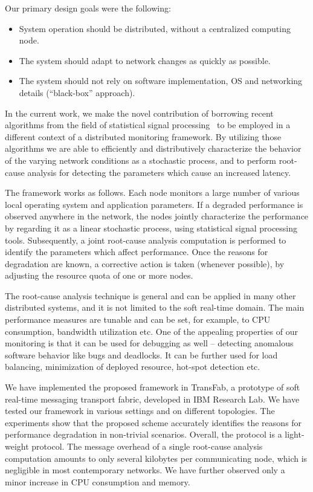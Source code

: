 \documentclass[times, 10pt,twocolumn]{article}
\begin{document}
Our primary design goals were the following:
\begin{itemize}
\item System operation should be distributed, without a centralized computing node.
\item The system should adapt to network changes as quickly as possible.
\item The system should not rely on software implementation, OS and networking details (``black-box'' approach).
\end{itemize}

In the current work, we make the novel contribution of borrowing recent algorithms from the field of statistical signal processing~\cite{Allerton08-2,ISIT1} to be employed in a different context of a distributed monitoring framework. By utilizing those algorithms we are able to efficiently and distributively characterize the behavior of the varying network conditions as a stochastic process, and to perform root-cause analysis for detecting the parameters which cause an increased latency.


The framework works as follows. Each node monitors a large number of various local operating system and application  parameters. If a degraded performance is observed anywhere in the network, the nodes jointly characterize the performance by regarding it as a linear stochastic process, using statistical signal processing tools. Subsequently,
a joint root-cause analysis computation is performed to identify the parameters which affect performance.
Once the reasons for degradation are known, a corrective action is taken (whenever possible), by adjusting the resource quota of one or more nodes.

The root-cause analysis technique is general and can be applied in many other distributed systems,
and it is not limited to the soft real-time domain. The main performance measures are tunable and can be
set, for example, to CPU consumption, bandwidth utilization etc. One of the appealing properties of our monitoring is that it can be used for debugging as well -- detecting anomalous software behavior
like bugs and deadlocks. It can be further used for load balancing, minimization
of deployed resource, hot-spot detection etc.

We have implemented the proposed framework in TransFab, a prototype of soft
real-time messaging transport fabric, developed in IBM Research Lab.
We have tested our framework in various settings and on different topologies.
The experiments show that the proposed scheme accurately identifies the reasons for performance
degradation in non-trivial scenarios. Overall, the protocol is a light-weight protocol. The message
overhead of a single root-cause analysis computation amounts to only several kilobytes per communicating node, which is negligible in most contemporary networks. We have further observed only a minor increase in CPU consumption and
memory. 
\end{document}
